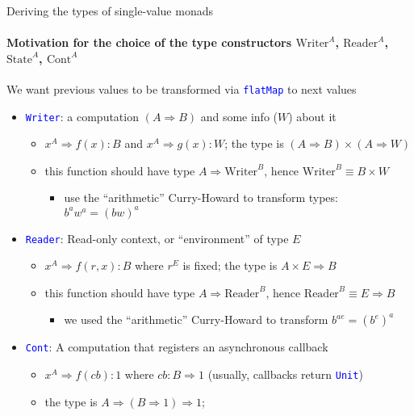 \documentclass[english]{beamer}
\begin{document}
\begin{frame}{Deriving the types of single-value monads}


\framesubtitle{Motivation for the choice of the type constructors $\text{Writer}^{A}$,
$\text{Reader}^{A}$, $\text{State}^{A}$, $\text{Cont}^{A}$}

We want previous values to be transformed via \texttt{\textcolor{blue}{\footnotesize{}flatMap}}
to next values
\begin{itemize}
\item \texttt{\textcolor{blue}{\footnotesize{}Writer}}: a computation $\left(A\Rightarrow B\right)$
and some info ($W$) about it
\begin{itemize}
\item $x^{A}\Rightarrow f(x):B$ and $x^{A}\Rightarrow g(x):W$; the type
is $\left(A\Rightarrow B\right)\times\left(A\Rightarrow W\right)$
\item this function should have type $A\Rightarrow\text{Writer}^{B}$, hence
$\text{Writer}^{B}\equiv B\times W$ 
\begin{itemize}
\item use the ``arithmetic'' Curry-Howard to transform types: $b^{a}w^{a}=(bw)^{a}$
\end{itemize}
\end{itemize}
\item \texttt{\textcolor{blue}{\footnotesize{}Reader}}: Read-only context,
or ``environment'' of type $E$
\begin{itemize}
\item $x^{A}\Rightarrow f(r,x):B$ where $r^{E}$ is fixed; the type is
$A\times E\Rightarrow B$
\item this function should have type $A\Rightarrow\text{Reader}^{B}$, hence
$\text{Reader}^{B}\equiv E\Rightarrow B$
\begin{itemize}
\item we used the ``arithmetic'' Curry-Howard to transform $b^{ae}=(b^{e})^{a}$
\end{itemize}
\end{itemize}
\item \texttt{\textcolor{blue}{\footnotesize{}Cont}}: A computation that
registers an asynchronous callback
\begin{itemize}
\item $x^{A}\Rightarrow f(cb):1$ where $cb:B\Rightarrow1$ (usually, callbacks
return \texttt{\textcolor{blue}{\footnotesize{}Unit}})
\item the type is{\footnotesize{} $A\Rightarrow\left(B\Rightarrow1\right)\Rightarrow1$};

\end{itemize}
\end{itemize}
\end{frame}
\end{document}
